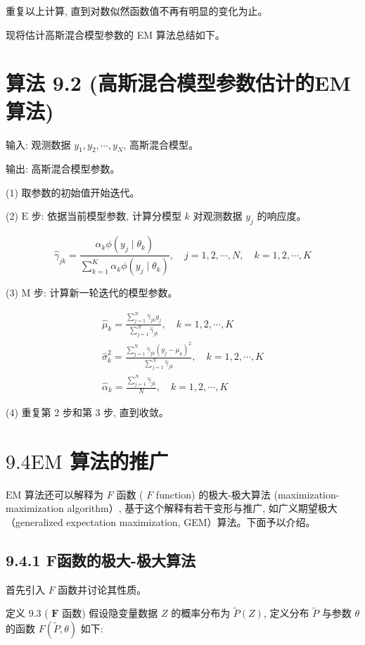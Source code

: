 \documentclass[10pt]{article}
\begin{document}
重复以上计算, 直到对数似然函数值不再有明显的变化为止。

现将估计高斯混合模型参数的 EM 算法总结如下。

\section*{算法 9.2 (高斯混合模型参数估计的EM算法)}
输入: 观测数据 $y_{1}, y_{2}, \cdots, y_{N}$, 高斯混合模型。

输出: 高斯混合模型参数。

(1) 取参数的初始值开始迭代。

(2) $\mathrm{E}$ 步: 依据当前模型参数, 计算分模型 $k$ 对观测数据 $y_{j}$ 的响应度。

$$
\hat{\gamma}_{j k}=\frac{\alpha_{k} \phi\left(y_{j} \mid \theta_{k}\right)}{\sum_{k=1}^{K} \alpha_{k} \phi\left(y_{j} \mid \theta_{k}\right)}, \quad j=1,2, \cdots, N, \quad k=1,2, \cdots, K
$$

(3) $\mathrm{M}$ 步: 计算新一轮迭代的模型参数。

$$
\begin{gathered}
\hat{\mu}_{k}=\frac{\sum_{j=1}^{N} \hat{\gamma}_{j k} y_{j}}{\sum_{j=1}^{N} \hat{\gamma}_{j k}}, \quad k=1,2, \cdots, K \\
\hat{\sigma}_{k}^{2}=\frac{\sum_{j=1}^{N} \hat{\gamma}_{j k}\left(y_{j}-\mu_{k}\right)^{2}}{\sum_{j=1}^{N} \hat{\gamma}_{j k}}, \quad k=1,2, \cdots, K \\
\hat{\alpha}_{k}=\frac{\sum_{j=1}^{N} \hat{\gamma}_{j k}}{N}, \quad k=1,2, \cdots, K
\end{gathered}
$$

(4) 重复第 2 步和第 3 步, 直到收敛。

\section*{$9.4 \mathrm{EM}$ 算法的推广}
$\mathrm{EM}$ 算法还可以解释为 $F$ 函数 ( $F$ function) 的极大-极大算法 (maximization-maximization algorithm）, 基于这个解释有若干变形与推广, 如广义期望极大（generalized expectation maximization, GEM）算法。下面予以介绍。

\subsection*{9.4.1 F函数的极大-极大算法}
首先引入 $F$ 函数并讨论其性质。

定义 9.3 ( $\boldsymbol{F}$ 函数) 假设隐变量数据 $Z$ 的概率分布为 $\tilde{P}(Z)$, 定义分布 $\tilde{P}$ 与参数 $\theta$ 的函数 $F(\tilde{P}, \theta)$ 如下:
\end{document}
